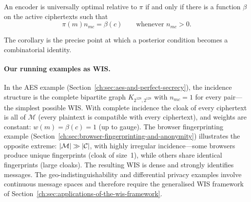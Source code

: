 \begin{corollary}\label{ch:cor:uo-factorisation}
An encoder is universally optimal relative to $\pi$ if and only if there is a function $\beta$ on the active ciphertexts such that
\[
 \pi(m)n_{mc}=\beta(c)
 \qquad\text{whenever }n_{mc}>0.
\]
\end{corollary}
The corollary is the precise point at which a posterior condition becomes a combinatorial identity.

\paragraph{Our running examples as WIS.}
In the AES example (Section~\ref{ch:sec:aes-and-perfect-secrecy}), the incidence structure is the complete bipartite graph $K_{2^{128},2^{128}}$ with $n_{mc}=1$ for every pair---the simplest possible WIS.  With complete incidence the cloak of every ciphertext is all of $\mathcal M$ (every plaintext is compatible with every ciphertext), and weights are constant: $w(m)=\beta(c)=1$ (up to gauge).  The browser fingerprinting example (Section~\ref{ch:sec:browser-fingerprinting-and-anonymity}) illustrates the opposite extreme: $|{\mathcal{M}}|\gg|{\mathcal{C}}|$, with highly irregular incidence---some browsers produce unique fingerprints (cloak of size~1), while others share identical fingerprints (large cloaks).  The resulting WIS is dense and strongly identifies messages.  The geo-indistinguishability and differential privacy examples involve continuous message spaces and therefore require the generalised WIS framework of Section~\ref{ch:sec:applications-of-the-wis-framework}.
\endinput
